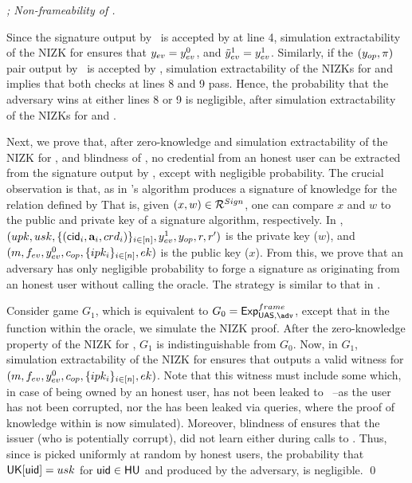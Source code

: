 \begin{proof}[; Non-frameability of \CUASGen]
  \label{prf:frame-uas}


  Since the signature output by \adv~is accepted by \Verify at line 4,
  simulation extractability of the NIZK for \RelSig ensures that $y_{ev} =
  y_{ev}^0$, and $\tilde{y}_{ev}^1 = y_{ev}^1$. Similarly, if the $(y_{op},\pi)$
  pair output by \adv~is accepted by \Judge, simulation extractability of
  the NIZKs for \RelSig and \RelIns implies that both checks at lines 8 and 9
  pass. Hence, the probability that the adversary wins at either lines 8 or 9 is
  negligible, after simulation extractability of the NIZKs for \RelSig and
  \RelIns.

  Next, we prove that, after zero-knowledge and simulation extractability of the
  NIZK for \RelSig, and blindness of \SBCM, no credential from an honest user
  can be extracted from the signature output by \adv, except with negligible
  probability.
  The crucial observation is that, as in \cite{cl06} \CUASGen's \Sign algorithm
  produces a signature of knowledge for the relation defined by \RelSig
  That is, given $(x,w) \in \mathcal{R}^{Sign}$, one can compare $x$ and $w$ to
  the public and private key of a signature algorithm, respectively. In \RelSig,
  $(upk,usk,\lbrace (\mathsf{cid}_i,\mathbf{a}_i,
  crd_i)\rbrace_{i\in[n]},y_{ev}^1,y_{op},r,r')$ is the private key ($w$), and
  $(m,f_{ev},y_{ev}^0,c_{op},\lbrace ipk_i \rbrace_{i\in[n]},ek)$ is the
  public key ($x$).
  From this, we prove that an adversary has only negligible probability to forge
  a signature as originating from an honest user without calling the \SIGN
  oracle. The strategy is similar to that in \cite[Theorem 2.1]{cl06}.

  Consider game $G_1$, which is equivalent to $G_0 = \ExpNonframe$, except that
  in the \Sign function within the \SIGN oracle, we simulate the NIZK proof.
  After the zero-knowledge property of the NIZK for \RelSig, $G_1$ is
  indistinguishable from $G_0$. Now, in $G_1$, simulation extractability of
  the NIZK for \RelSig ensures that \ExtractSign outputs a valid
  witness for $(m,f_{ev},y_{ev}^0,c_{op},\lbrace ipk_i \rbrace_{i\in[n]},
  ek)$. Note that this witness must include some \usk which, in case of
  being owned by an honest user, has not been leaked to \adv~--as the user
  has not been corrupted, nor the \usk has been leaked via \SIGN queries,
  where the proof of knowledge within \Sign is now simulated). Moreover,
  blindness of \SBCM ensures that the issuer (who is potentially corrupt), did
  not learn \usk either during calls to \OBTAIN. Thus, since \usk is picked
  uniformly at random by honest users, the probability that $\mathsf{UK}[\mathsf{uid}] = usk$
  for $\mathsf{uid} \in \mathsf{HU}$ and \Sig produced by the adversary, is negligible.
  \qed
\end{proof}

